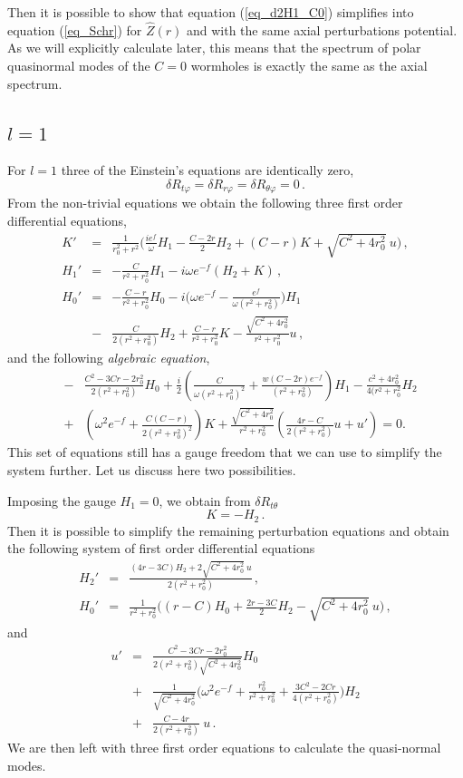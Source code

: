 \documentclass[a4paper,12pt]{article}
\def \nn {\nonumber}
\newcommand{\be}{\begin{equation}}
\newcommand{\ee}{\end{equation}}
\newcommand{\bea}{\begin{eqnarray}}
\newcommand{\eea}{\end{eqnarray}}
\begin{document}
Then it is possible to show that equation (\ref{eq_d2H1_C0}) simplifies into equation (\ref{eq_Schr}) for $\hat Z(r)$ and with the same axial perturbations potential. As we will explicitly calculate later, this means that the spectrum of polar quasinormal modes of the $C=0$ wormholes is exactly the same as the axial spectrum.



\subsection{$l=1$} 

For $l=1$ three of the Einstein's equations are identically zero,
    \be 
    \delta R_{t\varphi}=\delta R_{r\varphi}=\delta R_{\theta\varphi}=0 \,.
    \ee 
From the non-trivial equations we obtain the following three first order differential equations,
    \bea 
         \label{K}
     K' &=& \frac{1}{r_0^2+r^2}\Big(\frac{ie^{f}}{\omega}H_1-\frac{C-2r}{2}H_2+\left(C-r\right)K+\sqrt{C^2+4r_0^2}\ u\Big)\,,\\
      \label{F1}
     H_1' &=& -\frac{C}{r^2+r_0^2}H_1-i\omega e^{-f} \left(H_2+K\right) \,,\\    
     H_0' &=&-\frac{C-r}{r^2+r_0^2}H_0-i\Big(\omega e^{-f}-\frac{e^{f}}{\omega\left(r^2+r_0^2\right)}\Big)H_1\nn\\
     &-&\frac{C}{2\left(r^2+r_0^2\right)}H_2+\frac{C-r}{r^2+r_0^2}K-\frac{\sqrt{C^2+4r_0^2}}{r^2+r_0^2} u \,,     \label{F0}
     \eea
and the following \textit{algebraic equation},
    \bea
    &-&\frac{C^2-3Cr-2r_0^2}{2(r^2+r_0^2)}H_0+\frac{i}{2}\left(\frac{C}{\omega(r^2+r_0^2)^2}+\frac{w(C-2r)e^{-f}}{(r^2+r_0^2)}\right)H_1-\frac{c^2+4r_0^2}{4(r^2+r_0^2}H_2\nn\\
    &+&\left(\omega^2e^{-f}+\frac{C(C-r)}{2(r^2+r_0^2)^2}\right)K+\frac{\sqrt{C^2+4r_0^2}}{r^2+r_0^2}\left(\frac{4r-C}{2(r^2+r_0^2)}u+u'\right)=0. \label{alg_l1}
    \eea
This set of equations still has a gauge freedom that we can use to simplify the system further. 
Let us discuss here two possibilities. 

Imposing the gauge $H_1=0$, we obtain from $\delta R_{t\theta}$ 
     \be 
     K=-H_2 \,.
     \ee 
Then it is possible to simplify the remaining perturbation equations and obtain the following system of first order differential equations
    \bea 
     H_2'&=&\frac{(4r-3C)H_2+2\sqrt{C^2+4r_0^2}\ u
% 
}{2(r^2+r_0^2)}\,,  \\
     H_0'&=&\frac{1}{r^2+r_0^2}\Big(\left(r-C\right)H_0+\frac{2r-3C}{2}H_2-\sqrt{C^2+4r_0^2}\ u\Big) \,,
     \eea
and 
    \bea 
     u'&=&\frac{C^2-3Cr-2r_0^2}{2\left(r^2+r_0^2\right)\sqrt{C^2+4r_0^2}}H_0\nn\\
     &+&\frac{1}{\sqrt{C^2+4r_0^2}}\Big(\omega^2 e^{-f}+\frac{r_0^2}{r^2+r_0^2}+\frac{3C^2-2Cr}{4\left(r^2+r_0^2\right)}\Big)H_2\nn\\
     &+&\frac{C-4r}{2\left(r^2+r_0^2\right)}\ u \,.
    \eea 
We are then left with three first order equations to calculate the quasi-normal modes.
\end{document}
